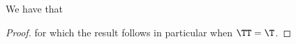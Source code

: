\begin{proposition}
  We have that %
\end{proposition}

\begin{proof}
  for which the result follows in particular when $\TT = \T$.
\end{proof}
